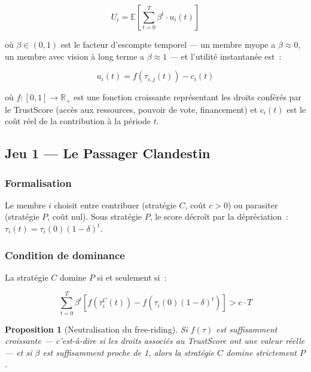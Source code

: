 \documentclass[12pt,a4paper]{article}
\theoremstyle{definition}
\theoremstyle{plain}
\newtheorem{proposition}{Proposition}[section]
\theoremstyle{remark}
\newcommand{\trustscore}{\tau}
\newcommand{\R}{\mathbb{R}}
\newcommand{\E}{\mathbb{E}}
\newcommand{\1}{\mathbf{1}}
\begin{document}
\begin{equation}
U_i = \E\left[\sum_{t=0}^{T} \beta^t \cdot u_i(t)\right]
\label{eq:utility}
\end{equation}

où $\beta \in (0,1)$ est le facteur d'escompte temporel --- un membre
\og{}myope\fg{} a $\beta \approx 0$, un membre avec vision à long terme a
$\beta \approx 1$ --- et l'utilité instantanée est~:

\begin{equation}
u_i(t) = f(\trustscore_{i,j}(t)) - c_i(t)
\end{equation}

où $f : [0,1] \to \R_+$ est une fonction croissante représentant les droits
conférés par le TrustScore (accès aux ressources, pouvoir de vote, financement)
et $c_i(t)$ est le coût réel de la contribution à la période $t$.

\subsection{Jeu 1 --- Le Passager Clandestin}

\subsubsection{Formalisation}

Le membre $i$ choisit entre contribuer (stratégie $C$, coût $c > 0$) ou
parasiter (stratégie $P$, coût nul). Sous stratégie $P$, le score décroît
par la dépréciation~: $\trustscore_i(t) = \trustscore_i(0)(1-\delta)^t$.

\subsubsection{Condition de dominance}

La stratégie $C$ domine $P$ si et seulement si~:

\begin{equation}
\sum_{t=0}^{T} \beta^t \left[f(\trustscore_i^C(t)) - f\!\left(\trustscore_i(0)(1-\delta)^t\right)\right] > c \cdot T
\label{eq:freerider}
\end{equation}

\begin{proposition}[Neutralisation du free-riding]
Si $f(\trustscore)$ est suffisamment croissante --- c'est-à-dire si les droits
associés au TrustScore ont une valeur réelle --- et si $\beta$ est
suffisamment proche de 1, alors la stratégie $C$ domine strictement $P$.
\end{proposition}
\end{document}
